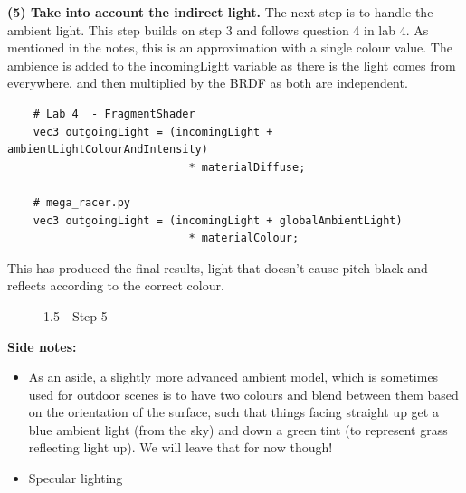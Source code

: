 \documentclass[a4 paper, 12pt]{article}
\begin{document}
\textbf{(5) Take into account the indirect light.}
The next step is to handle the ambient light. This step builds on step 3 and follows question 4 in lab 4. As mentioned in the notes, this is an approximation with a single colour value. The ambience is added to the incomingLight variable as there is the light comes from everywhere, and then multiplied by the BRDF as both are independent.
    \begin{lstlisting}
    # Lab 4  - FragmentShader
    vec3 outgoingLight = (incomingLight + ambientLightColourAndIntensity) 
                            * materialDiffuse;

    # mega_racer.py
    vec3 outgoingLight = (incomingLight + globalAmbientLight) 
                            * materialColour;                      
    \end{lstlisting}

This has produced the final results, light that doesn't cause pitch black and reflects according to the correct colour.
    \begin{figure} [H]
        
        \caption{1.5 - Step 5}   
    \end{figure}

\textbf{Side notes:}
    \begin{itemize}
        \item As an aside, a slightly more advanced ambient  model, which is sometimes used for outdoor scenes is to have two colours and blend between
        them based on the orientation of the surface, such that things facing straight up get a blue ambient light (from the sky) and down a green tint (to represent grass reflecting light up). We will leave that for now though!
        \item Specular lighting
    \end{itemize}
\end{document}
